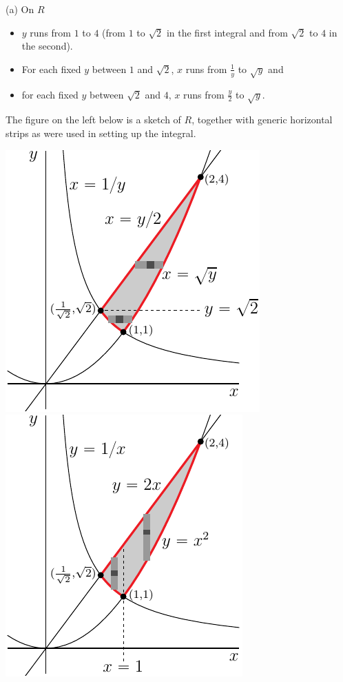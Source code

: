 \begin{solution}
(a) On $R$
\begin{itemize}
\item
$y$ runs from $1$ to $4$ (from $1$ to $\sqrt{2}$ in the first integral and
from $\sqrt{2}$ to $4$ in the second).
\item 
For each fixed $y$ between $1$ and $\sqrt{2}$, $x$ runs from $\frac{1}{y}$
to $\sqrt{y}$ and 
\item 
for each fixed $y$ between $\sqrt{2}$ and $4$, $x$ runs from $\frac{y}{2}$
to $\sqrt{y}$.
\end{itemize}
The figure on the left below is a sketch of $R$, together with 
generic horizontal strips as were used in setting up the integral.

\begin{center}
     \includegraphics{fig/OE06D_4h.pdf}\qquad
     \includegraphics{fig/OE06D_4v.pdf}
\end{center}


\end{solution}
